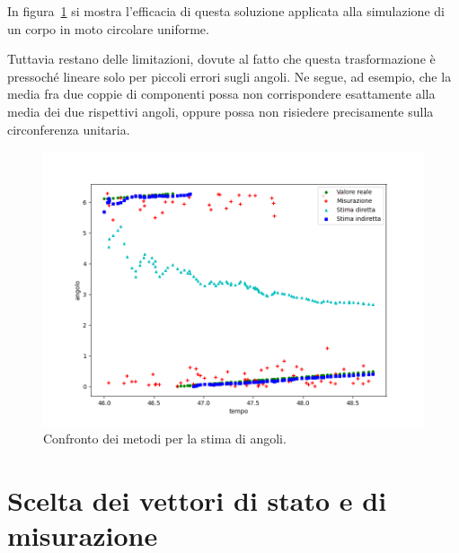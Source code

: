\documentclass[12pt,a4paper,openright,twoside]{book}
\begin{document}
In figura~\ref{fig:angle-method-comparison} si mostra l'efficacia di questa soluzione applicata alla simulazione di un corpo in moto circolare uniforme.

Tuttavia restano delle limitazioni, dovute al fatto che questa trasformazione è pressoché lineare solo per piccoli errori sugli angoli. Ne segue, ad esempio, che la media fra due coppie di componenti possa non corrispondere esattamente alla media dei due rispettivi angoli, oppure possa non risiedere precisamente sulla circonferenza unitaria.

\begin{figure}
    \centering
    \includegraphics[width=\linewidth]{figures/angle-method-comparison.png}
    \caption{Confronto dei metodi per la stima di angoli.}
    \label{fig:angle-method-comparison}
    \vspace{2\baselineskip}
\end{figure}

\section{Scelta dei vettori di stato e di misurazione}
\end{document}
